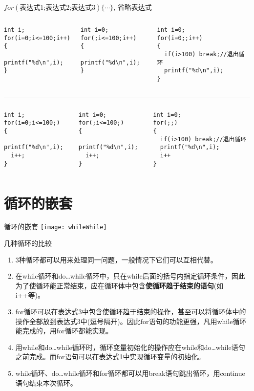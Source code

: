 \begin{frame}{$for(\text{表达式1;表达式2;表达式3}) \{\cdots\}$, 省略表达式}
\vspace{-0.5cm}
\begin{columns}%
\begin{lstlisting} 
int i;
for(i=0;i<=100;i++)
{
  printf("%d\n",i);
}
\end{lstlisting}
\begin{lstlisting}[frame=leftline] 
int i=0;
for(;i<=100;i++)
{
  printf("%d\n",i);
}
\end{lstlisting}
\begin{lstlisting}[frame=leftline]
int i=0;
for(i=0;;i++)
{
  if(i>100) break;//退出循环
  printf("%d\n",i);
}
\end{lstlisting}
\end{columns}
\rule{\textwidth}{1pt} %
\begin{columns}%
\begin{lstlisting} 
int i;
for(i=0;i<=100;)
{
  printf("%d\n",i);
  i++;
}
\end{lstlisting}
\begin{lstlisting}[frame=leftline] 
int i=0;
for(;i<=100;)
{
  printf("%d\n",i);
  i++;
}
\end{lstlisting}
\begin{lstlisting}[frame=leftline] 
int i=0;
for(;;)
{
  if(i>100) break;//退出循环  
  printf("%d\n",i);
  i++
}
\end{lstlisting}
\end{columns}
\end{frame}

\section{循环的嵌套}

\begin{frame}{循环的嵌套}
\centering
\texttt{[image: whileWhile]}
\end{frame}

\begin{frame}{几种循环的比较}
\begin{enumerate}
	\item 3种循环都可以用来处理同一问题，一般情况下它们可以互相代替。
	\item 在while循环和do…while循环中，只在while后面的括号内指定循环条件，因此为了使循环能正常结束，应在循环体中包含\textbf{使循环趋于结束的语句}(如i++等)。
	\item for循环可以在表达式3中包含使循环趋于结束的操作，甚至可以将循环体中的操作全部放到表达式3中(逗号隔开)。因此for语句的功能更强，凡用while循环能完成的，用for循环都能实现。
	\item 用while和do…while循环时，循环变量初始化的操作应在while和do…while语句之前完成。而for语句可以在表达式1中实现循环变量的初始化。
	\item while循环、do…while循环和for循环都可以用break语句跳出循环，用continue语句结束本次循环。	
\end{enumerate}
\end{frame}

